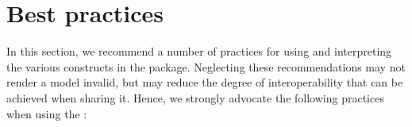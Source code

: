 
\section{Best practices}
\label{best-practices}

In this section, we recommend a number of practices for using and interpreting the various constructs in the  package. Neglecting these recommendations may not render a model invalid, but may reduce the degree of interoperability that can be achieved when sharing it. Hence, we strongly advocate the following practices when using the \sbmlthreedynamic:

